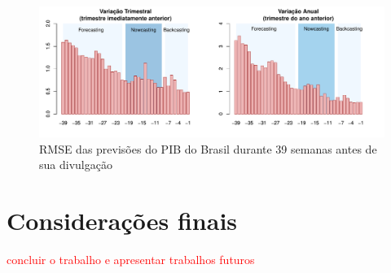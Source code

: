 \documentclass{article}
\begin{document}
\begin{figure}[h]
  \centering
  \includegraphics[width=1\textwidth]{rmse39_variacoes} %
  \caption{RMSE das previsões do PIB do Brasil durante 39 semanas antes de sua divulgação}
  \label{rmse39}
\end{figure}


\section{Considerações finais}\label{conclusao}

\textcolor{red}{concluir o trabalho e apresentar trabalhos futuros}



\end{document}
